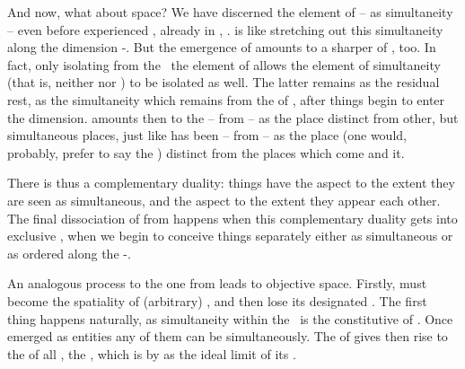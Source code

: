 \pa\label{pa:complementaryDuality} And now, what about space? We have discerned
the element of  -- as simultaneity -- even before experienced
, already in , .
 is like stretching out this simultaneity along the dimension
-.  But the emergence of  amounts to a
sharper  of , too. In fact, only isolating from
the \herenow\ the element of  allows the element of simultaneity (that
is, neither  nor ) to be isolated as well.  The latter
remains as the residual rest, as the simultaneity which remains from the
 of \herenow, after things begin to enter the
 dimension.   amounts then to 
the  -- from \herenow -- as the place distinct from other, but
simultaneous places, just like  has been  -- from
\herenow -- as the place (one would, probably, prefer to say the ) distinct from the places which come  and  it.

There is thus a complementary duality: things have the  aspect to
the extent they are seen as simultaneous, and the  aspect to
the extent they appear  each other.  The final dissociation of
 from  happens when this complementary duality
gets  into exclusive , when we begin to
conceive things separately either as simultaneous or as ordered along the
-.

\pa An analogous process to the one from  leads to
objective space. Firstly,  must become the spatiality of
(arbitrary) , and then lose its designated . The first
thing happens naturally, as simultaneity within the \hoa\ is the constitutive
 of . Once  emerged as 
entities any of them can be  simultaneously. The  of
 gives then rise to the  of all , the
, which is  by  as the ideal limit
of its .

